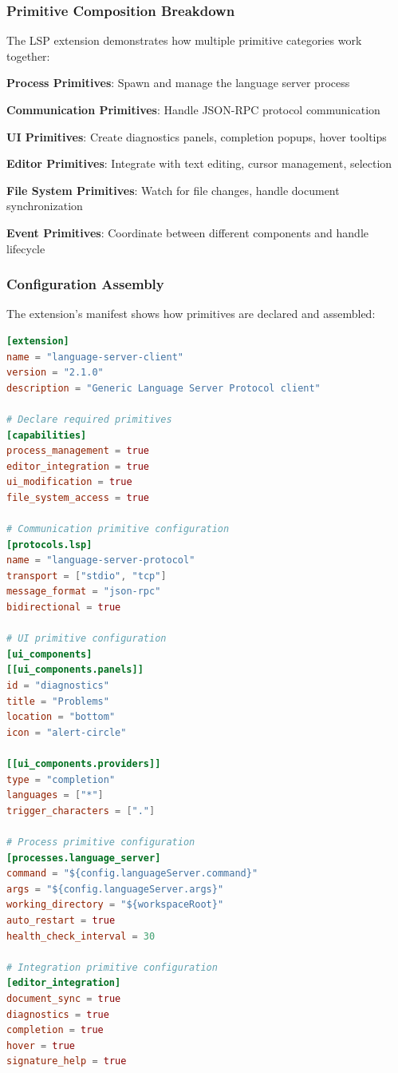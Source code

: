 \subsubsection*{Primitive Composition Breakdown}

The LSP extension demonstrates how multiple primitive categories work together:

\begin{expandedlist}
    \item \textbf{Process Primitives}: Spawn and manage the language server process
    \item \textbf{Communication Primitives}: Handle JSON-RPC protocol communication
    \item \textbf{UI Primitives}: Create diagnostics panels, completion popups, hover tooltips
    \item \textbf{Editor Primitives}: Integrate with text editing, cursor management, selection
    \item \textbf{File System Primitives}: Watch for file changes, handle document synchronization
    \item \textbf{Event Primitives}: Coordinate between different components and handle lifecycle
\end{expandedlist}

\subsubsection*{Configuration Assembly}

The extension's manifest shows how primitives are declared and assembled:

\begin{lstlisting}[language=toml, caption=LSP Extension Manifest]
[extension]
name = "language-server-client"
version = "2.1.0"
description = "Generic Language Server Protocol client"

# Declare required primitives
[capabilities]
process_management = true
editor_integration = true
ui_modification = true
file_system_access = true

# Communication primitive configuration
[protocols.lsp]
name = "language-server-protocol"
transport = ["stdio", "tcp"]
message_format = "json-rpc"
bidirectional = true

# UI primitive configuration
[ui_components]
[[ui_components.panels]]
id = "diagnostics"
title = "Problems"
location = "bottom"
icon = "alert-circle"

[[ui_components.providers]]
type = "completion"
languages = ["*"]
trigger_characters = ["."]

# Process primitive configuration
[processes.language_server]
command = "${config.languageServer.command}"
args = "${config.languageServer.args}"
working_directory = "${workspaceRoot}"
auto_restart = true
health_check_interval = 30

# Integration primitive configuration
[editor_integration]
document_sync = true
diagnostics = true
completion = true
hover = true
signature_help = true
\end{lstlisting}

